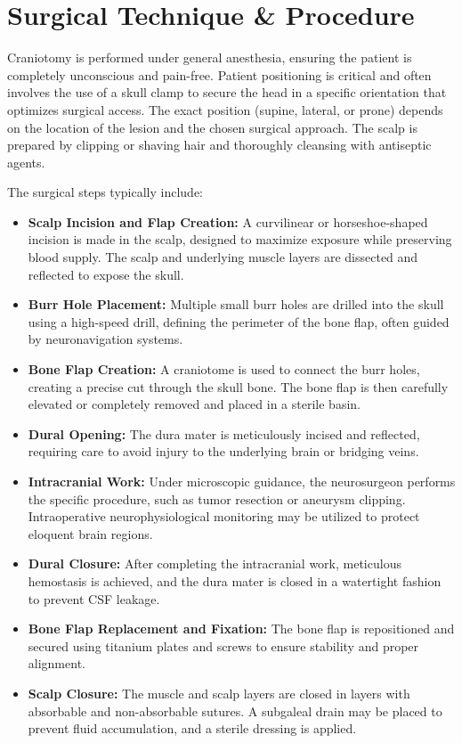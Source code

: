 \section*{Surgical Technique \& Procedure}
Craniotomy is performed under general anesthesia, ensuring the patient is completely unconscious and pain-free. Patient positioning is critical and often involves the use of a skull clamp to secure the head in a specific orientation that optimizes surgical access. The exact position (supine, lateral, or prone) depends on the location of the lesion and the chosen surgical approach. The scalp is prepared by clipping or shaving hair and thoroughly cleansing with antiseptic agents.

The surgical steps typically include:

\begin{itemize}
  \item \textbf{Scalp Incision and Flap Creation:} A curvilinear or horseshoe-shaped incision is made in the scalp, designed to maximize exposure while preserving blood supply. The scalp and underlying muscle layers are dissected and reflected to expose the skull.
  
  \item \textbf{Burr Hole Placement:} Multiple small burr holes are drilled into the skull using a high-speed drill, defining the perimeter of the bone flap, often guided by neuronavigation systems.
  
  \item \textbf{Bone Flap Creation:} A craniotome is used to connect the burr holes, creating a precise cut through the skull bone. The bone flap is then carefully elevated or completely removed and placed in a sterile basin.
  
  \item \textbf{Dural Opening:} The dura mater is meticulously incised and reflected, requiring care to avoid injury to the underlying brain or bridging veins.
  
  \item \textbf{Intracranial Work:} Under microscopic guidance, the neurosurgeon performs the specific procedure, such as tumor resection or aneurysm clipping. Intraoperative neurophysiological monitoring may be utilized to protect eloquent brain regions.
  
  \item \textbf{Dural Closure:} After completing the intracranial work, meticulous hemostasis is achieved, and the dura mater is closed in a watertight fashion to prevent CSF leakage.
  
  \item \textbf{Bone Flap Replacement and Fixation:} The bone flap is repositioned and secured using titanium plates and screws to ensure stability and proper alignment.
  
  \item \textbf{Scalp Closure:} The muscle and scalp layers are closed in layers with absorbable and non-absorbable sutures. A subgaleal drain may be placed to prevent fluid accumulation, and a sterile dressing is applied.
\end{itemize}

